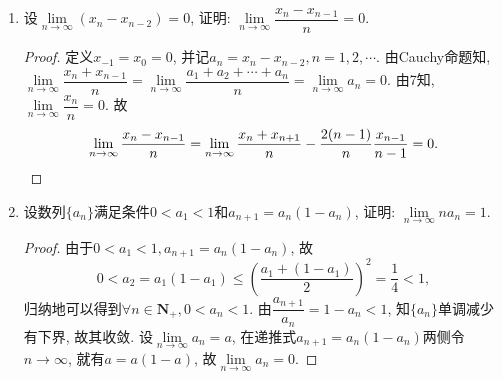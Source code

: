 \documentclass[a4paper,11pt,twoside]{ctexbook}
\begin{document}
\begin{enumerate}
	\item 设$\lim\limits_{n\to\infty} (x_n-x_{n-2})=0$, 证明: $\lim\limits_{n\to\infty} \dfrac{x_n-x_{n-1}}{n}=0$.
	      \begin{proof}
		      定义$x_{-1}=x_0=0$, 并记$a_n=x_n-x_{n-2}, n=1,2,\cdots$. 由Cauchy命题知, $\lim\limits_{n\to\infty} \dfrac{x_n+x_{n-1}}{n}=\lim\limits_{n\to\infty} \dfrac{a_1+a_2+\cdots+a_n}{n}=\lim\limits_{n\to\infty} a_n=0$. 由7知, $\lim\limits_{n\to\infty} \dfrac{x_n}{n}=0$. 故
		      \[
			      \lim\limits_{n\to\infty} \dfrac{x_n-x_{n-1}}{n}=\lim\limits_{n\to\infty} \dfrac{x_n+x_{n+1}}{n}-\dfrac{2(n-1)}{n}\dfrac{x_{n-1}}{n-1}=0.\qedhere
		      \]
	      \end{proof}
	\item 设数列$\{a_n\}$满足条件$0<a_1<1$和$a_{n+1}=a_n(1-a_n)$, 证明: $\lim\limits_{n\to\infty} na_n=1$.
	      \begin{proof}
		      由于$0<a_1<1, a_{n+1}=a_n(1-a_n)$, 故
		      \[
			      0<a_2=a_1(1-a_1)\leqslant\left(\dfrac{a_1+(1-a_1)}{2}\right)^2=\dfrac{1}{4}<1,
		      \]
		      归纳地可以得到$\forall n\in\mathbf{N}_{+}, 0<a_n<1$. 由$\dfrac{a_{n+1}}{a_n}=1-a_n<1$, 知$\{a_n\}$单调减少有下界, 故其收敛. 设$\lim\limits_{n\to\infty} a_n=a$, 在递推式$a_{n+1}=a_n(1-a_n)$两侧令$n\to\infty$, 就有$a=a(1-a)$, 故$\lim\limits_{n\to\infty} a_n=0$.


\end{proof}
\end{enumerate}
\end{document}
